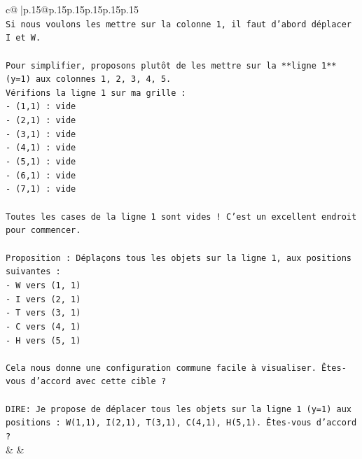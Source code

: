 \documentclass{article}
\begin{document}
{\begin{supertabular}{c@{$\;$}|p{.15\linewidth}@{}p{.15\linewidth}p{.15\linewidth}p{.15\linewidth}p{.15\linewidth}p{.15\linewidth}}
{{{\\ 
\texttt{Si nous voulons les mettre sur la colonne 1, il faut d'abord déplacer I et W.} \\
\\ 
\texttt{Pour simplifier, proposons plutôt de les mettre sur la **ligne 1** (y=1) aux colonnes 1, 2, 3, 4, 5.} \\
\texttt{Vérifions la ligne 1 sur ma grille :} \\
\texttt{{-} (1,1) : vide} \\
\texttt{{-} (2,1) : vide} \\
\texttt{{-} (3,1) : vide} \\
\texttt{{-} (4,1) : vide} \\
\texttt{{-} (5,1) : vide} \\
\texttt{{-} (6,1) : vide} \\
\texttt{{-} (7,1) : vide} \\
\\ 
\texttt{Toutes les cases de la ligne 1 sont vides ! C'est un excellent endroit pour commencer.} \\
\\ 
\texttt{Proposition : Déplaçons tous les objets sur la ligne 1, aux positions suivantes :} \\
\texttt{{-} W vers (1, 1)} \\
\texttt{{-} I vers (2, 1)} \\
\texttt{{-} T vers (3, 1)} \\
\texttt{{-} C vers (4, 1)} \\
\texttt{{-} H vers (5, 1)} \\
\\ 
\texttt{Cela nous donne une configuration commune facile à visualiser. Êtes{-}vous d'accord avec cette cible ?} \\
\\ 
\texttt{DIRE: Je propose de déplacer tous les objets sur la ligne 1 (y=1) aux positions : W(1,1), I(2,1), T(3,1), C(4,1), H(5,1). Êtes{-}vous d'accord ?} \\
            }
        }
    }
    & & \\ \\


\end{supertabular}}
\end{document}
